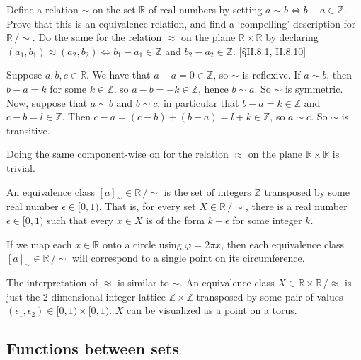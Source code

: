 \begin{problem}
  Define a relation $\sim$ on the set $\mathbb{R}$ of real numbers by
  setting $a\sim b\iff b-a\in\mathbb{Z}$. Prove that this is an equivalence
  relation, and find a `compelling' description for $\mathbb{R}\,/\!\sim$.
  Do the same for the relation $\approx$ on the plane $\mathbb{R}\times
  \mathbb{R}$ by declaring $(a_1,b_1)\approx(a_2,b_2)\iff
  b_1-a_1\in\mathbb{Z}$ and $b_2-a_2\in\mathbb{Z}$. [\S II.8.1, II.8.10]
\end{problem}
\begin{solution}
  Suppose $a,b,c\in\mathbb{R}$. We have that $a-a=0\in\mathbb{Z}$, so $\sim$
  is reflexive. If $a\sim b$, then $b-a=k$ for some $k\in\mathbb{Z}$, so
  $a-b=-k\in\mathbb{Z}$, hence $b\sim a$. So $\sim$ is symmetric. Now, suppose that $a\sim b$ and $b\sim c$, in particular that $b-a=k\in\mathbb{Z}$ and
  $c-b=l\in\mathbb{Z}$. Then $c-a=(c-b) + (b-a) = l+k\in\mathbb{Z}$, so
  $a\sim c$. So $\sim$ is transitive.

  Doing the same component-wise on for the relation $\approx$ on the plane
  $\mathbb{R}\times \mathbb{R}$ is trivial.

  An equivalence class $[a]_{\sim}\in\mathbb{R}\,/\!\sim$ is the set of
  integers $\mathbb{Z}$ transposed by some real number $\epsilon\in[0,1)$. That is, for every set $X\in\mathbb{R}\,/\!\sim$, there is a real number
  $\epsilon\in[0,1)$ such that every $x\in X$ is of the form $k+\epsilon$ for some integer $k$.

  If we map each $x\in\mathbb{R}$ onto a circle using $\varphi=2\pi x$, then
  each equivalence class $[a]_{\sim}\in\mathbb{R}\,/\!\sim$ will correspond to
  a single point on its circumference.

  The interpretation of $\approx$ is similar to $\sim$. An equivalence class
  $X\in\mathbb{R}\times\mathbb{R}\,/\approx$ is just the 2-dimensional integer lattice $\mathbb{Z}\times\mathbb{Z}$ transposed by some pair of values $(\epsilon_1,\epsilon_2)\in[0,1)\times[0,1)$. $X$ can be visualized as a point
  on a torus.
\end{solution}

\subsection{Functions between sets}


